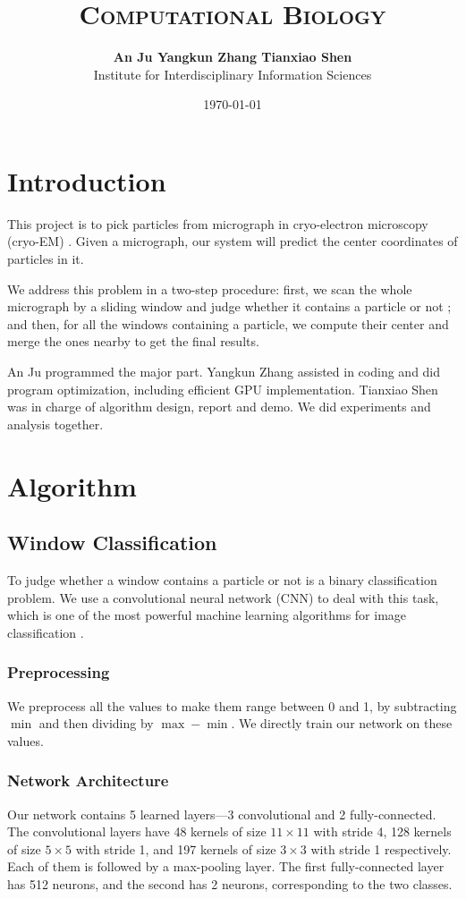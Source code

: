 \documentclass[11pt]{article}
\title{\textsc{Computational Biology}\\ \vspace{0.06in}{\bf\Large Project 1: Automated Particle Picking in Cryo-EM}}
\author{\vspace{0.05in}\textbf{An Ju \qquad Yangkun Zhang \qquad Tianxiao Shen}\\Institute for Interdisciplinary Information Sciences}
\date{\monthyeardate\today}
\begin{document}
\maketitle \thispagestyle{empty}


\section{Introduction}
This project is to pick particles from micrograph in cryo-electron microscopy (cryo-EM) \cite{liao2013structure}. Given a micrograph, our system will predict the center coordinates of particles in it.

We address this problem in a two-step procedure: first, we scan the whole micrograph by a sliding window and judge whether it contains a particle or not \cite{langlois2014automated}; and then, for all the windows containing a particle, we compute their center and merge the ones nearby to get the final results.

An Ju programmed the major part. Yangkun Zhang assisted in coding and did program optimization, including efficient GPU implementation. Tianxiao Shen was in charge of algorithm design, report and demo. We did experiments and analysis together.

\section{Algorithm}
\subsection{Window Classification}
To judge whether a window contains a particle or not is a binary classification problem. We use a convolutional neural network (CNN) to deal with this task, which is one of the most powerful machine learning algorithms for image classification \cite{krizhevsky2012imagenet} .

\subsubsection{Preprocessing}
We preprocess all the values to make them range between 0 and 1, by subtracting $\min$ and then dividing by $\max-\min$. We directly train our network on these values.

\subsubsection{Network Architecture}
Our network contains 5 learned layers---3 convolutional and 2 fully-connected. The convolutional layers have 48 kernels of size $11\times11$ with stride 4, 128 kernels of size $5\times5$ with stride 1, and 197 kernels of size $3\times3$ with stride 1 respectively. Each of them is followed by a max-pooling layer. The first fully-connected layer has 512 neurons, and the second has 2 neurons, corresponding to the two classes.
\end{document}
